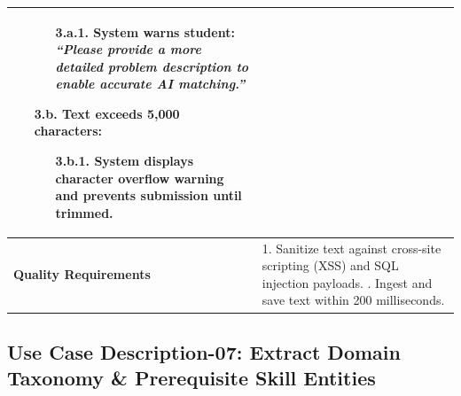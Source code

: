 \begin{table}[H]
\begin{tabularx}{\textwidth}{|l|X|}
\begin{itemize}[leftmargin=*]
    \begin{itemize}[leftmargin=*]
        \item[3.a.1.] System warns student: \textit{``Please provide a more detailed problem description to enable accurate AI matching.''}
    \end{itemize}
    \item[\textbf{3.b.}] \textbf{Text exceeds 5,000 characters:}
    \begin{itemize}[leftmargin=*]
        \item[3.b.1.] System displays character overflow warning and prevents submission until trimmed.
    \end{itemize}
\end{itemize} \\ \hline
\textbf{Quality Requirements} & 
1. Sanitize text against cross-site scripting (XSS) and SQL injection payloads. \newline
2. Ingest and save text within 200 milliseconds. \\ \hline
\end{tabularx}
\end{table}

\clearpage
\subsection{Use Case Description-07: Extract Domain Taxonomy \& Prerequisite Skill Entities}
\label{subsec:uc07}

